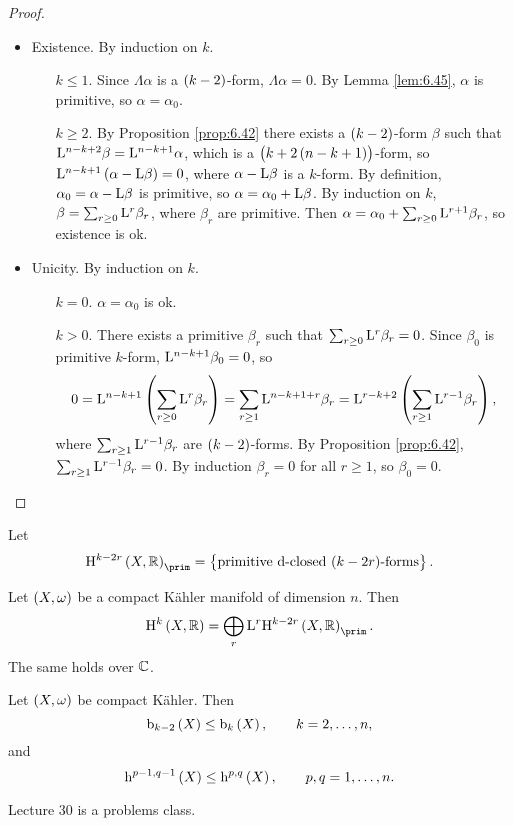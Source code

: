 \begin{proof}
\hfill
\begin{itemize}
\item Existence. By induction on $ k $.
\begin{itemize}[leftmargin=0.5in]
\item[$ k \le 1 $.] Since $ \Lambda\alpha $ is a $ \br{k - 2} $-form, $ \Lambda\alpha = 0 $. By Lemma \ref{lem:6.45}, $ \alpha $ is primitive, so $ \alpha = \alpha_0 $.
\item[$ k \ge 2 $.] By Proposition \ref{prop:6.42} there exists a $ \br{k - 2} $-form $ \beta $ such that $ \mathrm{L}^{n - k + 2}\beta = \mathrm{L}^{n - k + 1}\alpha $, which is a $ \br{k + 2\br{n - k + 1}} $-form, so $ \L^{n - k + 1}\br{\alpha - \L\beta} = 0 $, where $ \alpha - \mathrm{L}\beta $ is a $ k $-form. By definition, $ \alpha_0 = \alpha - \mathrm{L}\beta $ is primitive, so $ \alpha = \alpha_0 + \mathrm{L}\beta $. By induction on $ k $, $ \beta = \sum_{r \ge 0} \mathrm{L}^r\beta_r $, where $ \beta_r $ are primitive. Then $ \alpha = \alpha_0 + \sum_{r \ge 0} \mathrm{L}^{r + 1}\beta_r $, so existence is ok.
\end{itemize}
\item Unicity. By induction on $ k $.
\begin{itemize}[leftmargin=0.5in]
\item[$ k = 0 $.] $ \alpha = \alpha_0 $ is ok.
\item[$ k > 0 $.] There exists a primitive $ \beta_r $ such that $ \sum_{r \ge 0} \mathrm{L}^r\beta_r = 0 $. Since $ \beta_0 $ is primitive $ k $-form, $ \mathrm{L}^{n - k + 1}\beta_0 = 0 $, so
$$ 0 = \L^{n - k + 1}\br{\sum_{r \ge 0} \L^r\beta_r} = \sum_{r \ge 1} \L^{n - k + 1 + r}\beta_r = \L^{r - k + 2}\br{\sum_{r \ge 1} \L^{r - 1}\beta_r}, $$
where $ \sum_{r \ge 1} \mathrm{L}^{r - 1}\beta_r $ are $ \br{k - 2} $-forms. By Proposition \ref{prop:6.42}, $ \sum_{r \ge 1} \mathrm{L}^{r - 1}\beta_r = 0 $. By induction $ \beta_r = 0 $ for all $ r \ge 1 $, so $ \beta_0 = 0 $.
\end{itemize}
\end{itemize}
\end{proof}

\begin{definition}
Let
$$ \H^{k - 2r}\br{X, \RR}_{\prim} = \cbr{\text{primitive $ \d $-closed $ \br{k - 2r} $-forms}}. $$
\end{definition}

\begin{theorem}
\label{thm:6.48}
Let $ \br{X, \omega} $ be a compact K\"ahler manifold of dimension $ n $. Then
$$ \H^k\br{X, \RR} = \bigoplus_r \L^r\H^{k - 2r}\br{X, \RR}_{\prim}. $$
The same holds over $ \mathbb{C} $.
\end{theorem}

\begin{remark}
Let $ \br{X, \omega} $ be compact K\"ahler. Then
$$ \b_{k - 2}\br{X} \le \b_k\br{X}, \qquad k = 2, \dots, n, $$
and
$$ \h^{p - 1, q - 1}\br{X} \le \h^{p, q}\br{X}, \qquad p, q = 1, \dots, n. $$
\end{remark}


Lecture 30 is a problems class.

